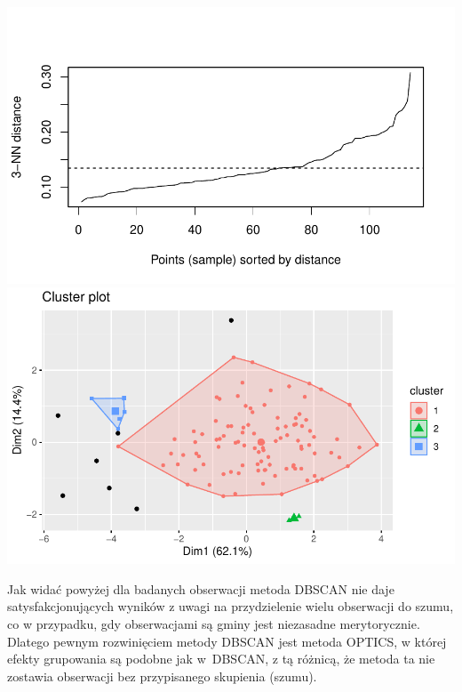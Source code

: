 \documentclass{amuthesis}
\begin{document}
\begin{center}\includegraphics[width=1\linewidth]{figures/unnamed-chunk-15-1} \includegraphics[width=1\linewidth]{figures/unnamed-chunk-15-2} \end{center}

Jak widać powyżej dla badanych obserwacji metoda DBSCAN nie daje satysfakcjonujących wyników z uwagi na przydzielenie wielu obserwacji do szumu, co w przypadku, gdy obserwacjami są gminy jest niezasadne merytorycznie. Dlatego pewnym rozwinięciem metody DBSCAN jest metoda OPTICS, w której efekty grupowania są podobne jak w~DBSCAN, z tą różnicą, że metoda ta nie zostawia obserwacji bez przypisanego skupienia (szumu).

\begin{Shaded}
\begin{Highlighting}[]
\OtherTok{\textless{}{-}}\SpecialCharTok{::} \NormalTok{, } \NormalTok{)}
\end{Highlighting}
\end{Shaded}
\end{document}

